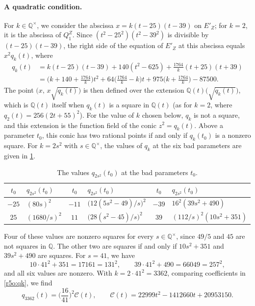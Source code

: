 \documentclass[12pt,oneside,openany]{book}
\theoremstyle{definition}
\theoremstyle{plain}
\numberwithin{equation}{chapter}
\theoremstyle{plain}
\theoremstyle{definition}
\theoremstyle{remark}
\newcommand{\Q}{\mathbb Q}
\begin{document}
\paragraph{A quadratic condition.} For $k\in\Q^\times$, we consider the abscissa $x=k(t-25)(t-39)$ on $E'_Z$; for $k=2$, it is the abscissa of $Q^Z_1$. Since $(t^2-25^2)(t^2-39^2)$ is divisible by $(t-25)(t-39)$, the right side of the equation of $E'_Z$ at this abscissa equals $x^2q_k(t)$, where
\begin{equation}\label{r5o:qk}
\begin{aligned}
q_k(t)&=k(t-25)(t-39)+140(t^2-625)+\frac{1764}k(t+25)(t+39)\\
&=\Big(k+140+\frac{1764}k\Big)t^2+64\Big(\frac{1764}k-k\Big)t+975\Big(k+\frac{1764}k\Big)-87500.
\end{aligned}
\end{equation}
The point $\big(x,\,x\sqrt{q_k(t)}\big)$ is then defined over the extension $\Q(t)\big(\sqrt{q_k(t)}\big)$, which is $\Q(t)$ itself when $q_k(t)$ is a square in $\Q(t)$ (as for $k=2$, where $q_2(t)=256(2t+55)^2$). For the value of $k$ chosen below, $q_k$ is not a square, and this extension is the function field of the conic $z^2=q_k(t)$. Above a parameter $t_0$, this conic has two rational points if and only if $q_k(t_0)$ is a nonzero square. For $k=2s^2$ with $s\in\Q^\times$, the values of $q_k$ at the six bad parameters are given in \cref{tab:r5o-values}.

\begin{table}[htbp]
\centering
\caption{The values $q_{2s^2}(t_0)$ at the bad parameters $t_0$.}\label{tab:r5o-values}
\begin{tabular}{cl@{\qquad}cl@{\qquad}cl}
\toprule
$t_0$ & $q_{2s^2}(t_0)$ & $t_0$ & $q_{2s^2}(t_0)$ & $t_0$ & $q_{2s^2}(t_0)$\\
\midrule
$-25$ & $(80s)^2$ & $-11$ & $\big(12(5s^2-49)/s\big)^2$ & $-39$ & $16^2(39s^2+490)$\\
$25$ & $(1680/s)^2$ & $11$ & $\big(28(s^2-45)/s\big)^2$ & $39$ & $(112/s)^2(10s^2+351)$\\
\bottomrule
\end{tabular}
\end{table}

Four of these values are nonzero squares for every $s\in\Q^\times$, since $49/5$ and $45$ are not squares in $\Q$. The other two are squares if and only if $10s^2+351$ and $39s^2+490$ are squares. For $s=41$, we have
\[
10\cdot41^2+351=17161=131^2,\qquad 39\cdot41^2+490=66049=257^2,
\]
and all six values are nonzero. With $k=2\cdot41^2=3362$, comparing coefficients in \eqref{r5o:qk}, we find
\[
q_{3362}(t)=\Big(\frac{16}{41}\Big)^2\mathcal C(t),\qquad \mathcal C(t)=22999t^2-1412660t+20953150.
\]
\end{document}

